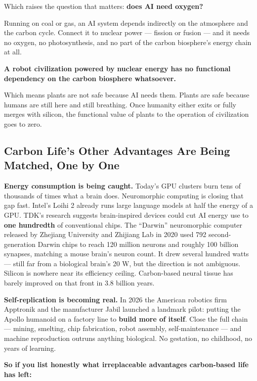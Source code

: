 \documentclass[11pt,a4paper]{article}
\begin{document}
Which raises the question that matters: \textbf{does AI need oxygen?}

Running on coal or gas, an AI system depends indirectly on the atmosphere and the carbon cycle. Connect it to nuclear power --- fission or fusion --- and it needs no oxygen, no photosynthesis, and no part of the carbon biosphere's energy chain at all.

\textbf{A robot civilization powered by nuclear energy has no functional dependency on the carbon biosphere whatsoever.}

Which means plants are not safe because AI needs them. Plants are safe because humans are still here and still breathing. Once humanity either exits or fully merges with silicon, the functional value of plants to the operation of civilization goes to zero.

\subsection{Carbon Life's Other Advantages Are Being Matched, One by One}

\textbf{Energy consumption is being caught.} Today's GPU clusters burn tens of thousands of times what a brain does. Neuromorphic computing is closing that gap fast. Intel's Loihi 2 already runs large language models at half the energy of a GPU. TDK's research suggests brain-inspired devices could cut AI energy use to \textbf{one hundredth} of conventional chips. The ``Darwin'' neuromorphic computer released by Zhejiang University and Zhijiang Lab in 2020 used 792 second-generation Darwin chips to reach 120 million neurons and roughly 100 billion synapses, matching a mouse brain's neuron count. It drew several hundred watts --- still far from a biological brain's 20 W, but the direction is not ambiguous. Silicon is nowhere near its efficiency ceiling. Carbon-based neural tissue has barely improved on that front in 3.8 billion years.

\textbf{Self-replication is becoming real.} In 2026 the American robotics firm Apptronik and the manufacturer Jabil launched a landmark pilot: putting the Apollo humanoid on a factory line to \textbf{build more of itself}. Close the full chain --- mining, smelting, chip fabrication, robot assembly, self-maintenance --- and machine reproduction outruns anything biological. No gestation, no childhood, no years of learning.

\textbf{So if you list honestly what irreplaceable advantages carbon-based life has left:}
\end{document}
